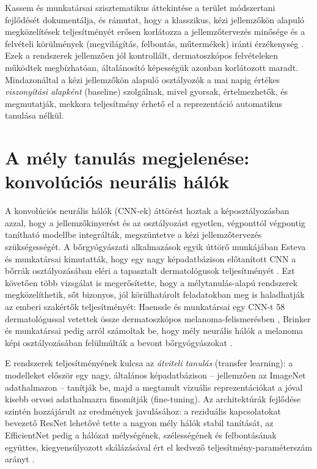 Kassem és munkatársai szisztematikus áttekintése a terület módszertani
fejlődését dokumentálja, és rámutat, hogy a klasszikus, kézi jellemzőkön alapuló
megközelítések teljesítményét erősen korlátozza a jellemzőtervezés minősége és a
felvételi körülmények (megvilágítás, felbontás, műtermékek) iránti
érzékenység \cite{kassem2021review}. Ezek a rendszerek jellemzően jól
kontrollált, dermatoszkópos felvételeken működtek megbízhatóan, általánosító
képességük azonban korlátozott maradt. Mindazonáltal a kézi jellemzőkön alapuló
osztályozók a mai napig értékes \textit{viszonyítási alapként} (baseline)
szolgálnak, mivel gyorsak, értelmezhetők, és megmutatják, mekkora teljesítmény
érhető el a reprezentáció automatikus tanulása nélkül.

\section{A mély tanulás megjelenése: konvolúciós neurális hálók}

A konvolúciós neurális hálók (CNN-ek) áttörést hoztak a képosztályozásban azzal,
hogy a jellemzőkinyerést és az osztályozást egyetlen, végponttól végpontig
tanítható modellbe integrálták, megszüntetve a kézi jellemzőtervezés
szükségességét. A bőrgyógyászati alkalmazások egyik úttörő munkájában Esteva és
munkatársai kimutatták, hogy egy nagy képadatbázison előtanított CNN a bőrrák
osztályozásában eléri a tapasztalt dermatológusok teljesítményét
\cite{esteva2017dermatologist}. Ezt követően több vizsgálat is megerősítette,
hogy a mélytanulás-alapú rendszerek megközelíthetik, sőt bizonyos, jól
körülhatárolt feladatokban meg is haladhatják az emberi szakértők
teljesítményét: Haenssle és munkatársai egy CNN-t 58 dermatológussal vetettek
össze dermatoszkópos melanoma-felismerésben \cite{haenssle2018man}, Brinker és
munkatársai pedig arról számoltak be, hogy mély neurális hálók a melanoma
képi osztályozásában felülmúlták a bevont bőrgyógyászokat \cite{brinker2019deep}.

E rendszerek teljesítményének kulcsa az \textit{átviteli tanulás} (transfer
learning): a modelleket először egy nagy, általános képadatbázison -- jellemzően
az ImageNet adathalmazon \cite{russakovsky2015imagenet} -- tanítják be, majd a
megtanult vizuális reprezentációkat a jóval kisebb orvosi adathalmazra finomítják
(fine-tuning). Az architektúrák fejlődése szintén hozzájárult az eredmények
javulásához: a reziduális kapcsolatokat bevezető ResNet \cite{he2016resnet}
lehetővé tette a nagyon mély hálók stabil tanítását, az EfficientNet pedig a
hálózat mélységének, szélességének és felbontásának együttes, kiegyensúlyozott
skálázásával ért el kedvező teljesítmény-paraméterszám arányt
\cite{tan2019efficientnet}.

